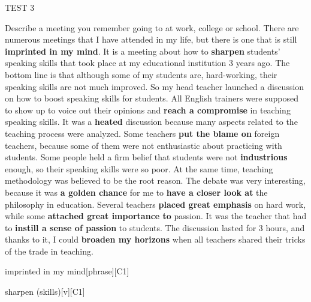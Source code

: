 \begin{glossarymc}[Cambridge 8]
\begin{test}{TEST 3}
\begin{qa}{Describe a meeting you remember going to at work, college or school.}
    There are numerous meetings that I have attended in my life, but there is one that is still \textbf{imprinted in my mind}. It is a meeting about how to \textbf{sharpen} students’ speaking skills that took place at my educational institution 3 years ago. The bottom line is that although some of my students are, hard-working, their speaking skills are not much improved. So my head teacher launched a discussion on how to boost speaking skills for students. All English trainers were supposed to show up to voice out their opinions and \textbf{reach a compromise} in teaching speaking skills. It was a \textbf{heated} discussion because many aspects related to the teaching process were analyzed. Some teachers \textbf{put the blame on} foreign teachers, because some of them were not enthusiastic about practicing with students. Some people held a firm belief that students were not \textbf{industrious} enough, so their speaking skills were so poor. At the same time, teaching methodology was believed to be the root reason. The debate was very interesting, because it was \textbf{a golden chance} for me to \textbf{have a closer look at} the philosophy in education. Several teachers \textbf{placed great emphasis} on hard work, while some \textbf{attached great importance to} passion. It was the teacher that had to \textbf{instill a sense of passion} to students. The discussion lasted for 3 hours, and thanks to it, I could \textbf{broaden my horizons} when all teachers shared their tricks of the trade in teaching.
    \end{qa}
        \begin{VocabExplain}[Part 2]
            \begin{ExplainCard}{imprinted in my mind}[phrase][C1]
            \end{ExplainCard}

            \begin{ExplainCard}{sharpen (skills)}[v][C1]
            \end{ExplainCard}


\end{VocabExplain}
\end{test}
\end{glossarymc}
